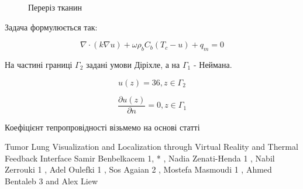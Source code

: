 \begin{figure}[ht!]
    \centering
    
    \caption{Переріз тканин}
    \label{fig:thermo_2d_domain}
\end{figure}

Задача формулюється так:

\begin{equation}
    \label{eqn:thermo_2d_1}
    \nabla \cdot (k \nabla u) + \omega \rho_b C_b (T_c - u) + q_m  = 0
\end{equation}

На частині границі $\Gamma_2$ задані умови Діріхле, а на $\Gamma_1$ - Неймана.

\begin{equation}
    \label{eqn:thermo_2d_2}
    u(z) = 36, z \in \Gamma_2
\end{equation}

\begin{equation}
    \label{eqn:thermo_2d_3}
    \dfrac{\partial{u(z)}}{\partial{n}} = 0, z \in \Gamma_1
\end{equation}

Коефіцієнт тепропровідності візьмемо на основі статті

Tumor Lung Visualization and Localization through Virtual
Reality and Thermal Feedback Interface
Samir Benbelkacem 1, * , Nadia Zenati-Henda 1 , Nabil Zerrouki 1 , Adel Oulefki 1 , Sos Agaian 2 ,
Mostefa Masmoudi 1 , Ahmed Bentaleb 3 and Alex Liew


